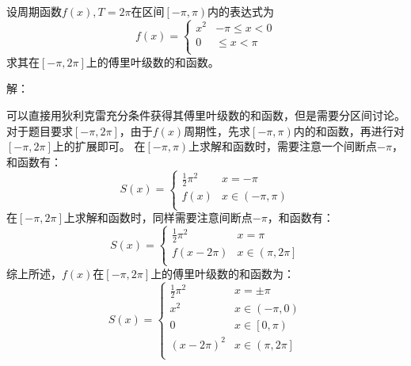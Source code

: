 ~

\begin{example}
设周期函数$f\left( x \right) ,T=2\pi $在区间$\left[ -\pi ,\pi \right) $内的表达式为
\[
f\left( x \right) =\begin{cases}
	x^2 & -\pi \leqslant x<0\\
	0 & \leqslant x<\pi\\
\end{cases}
\]
求其在$\left[ -\pi ,2\pi \right] $上的傅里叶级数的和函数。
\end{example}

解：

可以直接用狄利克雷充分条件获得其傅里叶级数的和函数，但是需要分区间讨论。
对于题目要求$\left[ -\pi ,2\pi \right] $，由于$f\left( x \right) $周期性，先求$\left[ -\pi ,\pi \right) $内的和函数，再进行对$\left[ -\pi ,2\pi \right] $上的扩展即可。
在$\left[ -\pi ,\pi \right) $上求解和函数时，需要注意一个间断点$-\pi $，和函数有：
\[
S\left( x \right) =\begin{cases}
	\frac{1}{2}\pi ^2 & x=-\pi\\
	f\left( x \right) & x\in \left( -\pi ,\pi \right)\\
\end{cases}
\]
在$\left[ -\pi ,2\pi \right] $上求解和函数时，同样需要注意间断点$-\pi $，和函数有：
\[
S\left( x \right) =\begin{cases}
	\frac{1}{2}\pi ^2 & x=\pi\\
	f\left( x-2\pi \right) & x\in \left( \pi ,2\pi \right]\\
\end{cases}
\]
综上所述，$f\left( x \right) $在$\left[ -\pi ,2\pi \right] $上的傅里叶级数的和函数为：
\[
S\left( x \right) =\begin{cases}
	\frac{1}{2}\pi ^2 & x=\pm \pi\\
	x^2 & x\in \left( -\pi ,0 \right)\\
	0 & x\in \left[ 0,\pi \right)\\
	\left( x-2\pi \right) ^2 & x\in \left( \pi ,2\pi \right]\\
\end{cases}
\]




